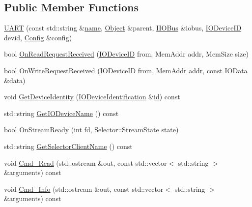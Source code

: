 \subsection*{Public Member Functions}
\begin{DoxyCompactItemize}
\item 
\hyperlink{class_simulator_1_1_u_a_r_t_aa94db533642fee1e8c1bc22a5dec3bff}{U\+A\+R\+T} (const std\+::string \&\hyperlink{mtconf_8c_a8f8f80d37794cde9472343e4487ba3eb}{name}, \hyperlink{class_simulator_1_1_object}{Object} \&parent, \hyperlink{class_simulator_1_1_i_i_o_bus}{I\+I\+O\+Bus} \&iobus, \hyperlink{namespace_simulator_a3493d987c866ad6b8aaa704c42502db0}{I\+O\+Device\+I\+D} devid, \hyperlink{class_config}{Config} \&config)
\item 
bool \hyperlink{class_simulator_1_1_u_a_r_t_a13c24fb3b38610ffaa6e10e591572f11}{On\+Read\+Request\+Received} (\hyperlink{namespace_simulator_a3493d987c866ad6b8aaa704c42502db0}{I\+O\+Device\+I\+D} from, Mem\+Addr addr, Mem\+Size size)
\item 
bool \hyperlink{class_simulator_1_1_u_a_r_t_a81469c8d923a6b5e8bcec83a865da803}{On\+Write\+Request\+Received} (\hyperlink{namespace_simulator_a3493d987c866ad6b8aaa704c42502db0}{I\+O\+Device\+I\+D} from, Mem\+Addr addr, const \hyperlink{struct_simulator_1_1_i_o_data}{I\+O\+Data} \&data)
\item 
void \hyperlink{class_simulator_1_1_u_a_r_t_a1011654eefba86dc63c4db25186b3ef9}{Get\+Device\+Identity} (\hyperlink{struct_simulator_1_1_i_o_device_identification}{I\+O\+Device\+Identification} \&\hyperlink{mtconf_8c_aa3185401f04d30bd505daebf48c39cc5}{id}) const 
\item 
std\+::string \hyperlink{class_simulator_1_1_u_a_r_t_ad2aa8670409b0be39d5e9aa517c05649}{Get\+I\+O\+Device\+Name} () const 
\item 
bool \hyperlink{class_simulator_1_1_u_a_r_t_aeb7c988af3707643d2483b577f29a150}{On\+Stream\+Ready} (int fd, \hyperlink{class_simulator_1_1_selector_ac8adf93ea9b0350b3b39dbbbf048d626}{Selector\+::\+Stream\+State} state)
\item 
std\+::string \hyperlink{class_simulator_1_1_u_a_r_t_ae7199c89b0b5bed0c2bd9d8f9373ec16}{Get\+Selector\+Client\+Name} () const 
\item 
void \hyperlink{class_simulator_1_1_u_a_r_t_a396f987e21ff119f963caebf6a58a124}{Cmd\+\_\+\+Read} (std\+::ostream \&out, const std\+::vector$<$ std\+::string $>$ \&arguments) const 
\item 
void \hyperlink{class_simulator_1_1_u_a_r_t_af361d08bb144f3ea7fa87545b8ca2bd9}{Cmd\+\_\+\+Info} (std\+::ostream \&out, const std\+::vector$<$ std\+::string $>$ \&arguments) const 
\end{DoxyCompactItemize}


